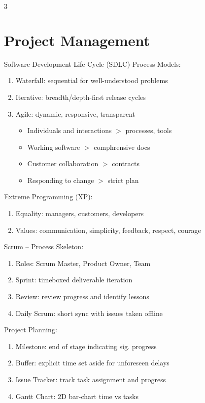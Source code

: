 \documentclass[12pt, a4paper]{article}
\begin{document}
\begin{multicols*}{3}
\section{Project Management}
Software Development Life Cycle (SDLC) Process Models:
\begin{enumerate}[\roman*.]
  \item Waterfall: sequential for well-understood problems
  \item Iterative: breadth/depth-first release cycles 
  \item Agile: dynamic, responsive, transparent 
    \begin{itemize}[leftmargin=*]\vspace{3pt}
      \item Individuals and interactions $>$ processes, tools 
      \item Working software $>$ comphrensive docs 
      \item Customer collaboration $>$ contracts 
      \item Responding to change $>$ strict plan
    \end{itemize}
\end{enumerate}

Extreme Programming (XP):
\begin{enumerate}[\roman*.]
  \item Equality: managers, customers, developers
  \item Values: communication, simplicity, feedback, respect, courage
\end{enumerate}

Scrum -- Process Skeleton:
\begin{enumerate}[\roman*.]
  \item Roles: Scrum Master, Product Owner, Team
  \item Sprint: timeboxed deliverable iteration  
  \item Review: review progress and identify lessons 
  \item Daily Scrum: short sync with issues taken offline
\end{enumerate}

Project Planning:
\begin{enumerate}[\roman*.]
  \item Milestone: end of stage indicating sig. progress
  \item Buffer: explicit time set aside for unforeseen delays
  \item Issue Tracker: track task assignment and progress
  \item Gantt Chart: 2D bar-chart time vs tasks
\end{enumerate}


\end{multicols*}
\end{document}
